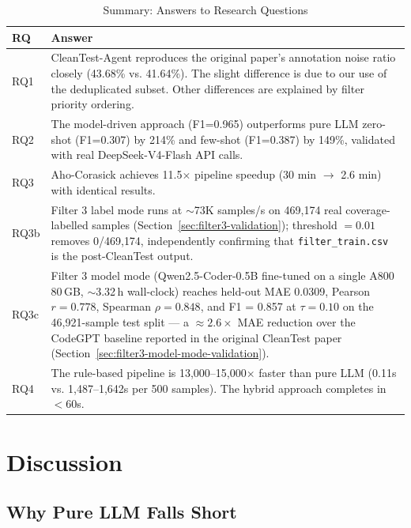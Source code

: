 \documentclass[acmlarge,nonacm,screen]{acmart}
\begin{document}
\begin{table}[htbp]
\caption{Summary: Answers to Research Questions}
\label{tab:rq-summary}
\begin{tabular}{@{}lp{9cm}@{}}
\toprule
\textbf{RQ} & \textbf{Answer} \\
\midrule
RQ1 & CleanTest-Agent reproduces the original paper's annotation noise ratio closely (43.68\% vs. 41.64\%). The slight difference is due to our use of the deduplicated subset. Other differences are explained by filter priority ordering. \\
RQ2 & The model-driven approach (F1=0.965) outperforms pure LLM zero-shot (F1=0.307) by 214\% and few-shot (F1=0.387) by 149\%, validated with real DeepSeek-V4-Flash API calls. \\
RQ3 & Aho-Corasick achieves 11.5$\times$ pipeline speedup (30 min $\to$ 2.6 min) with identical results. \\
RQ3b & Filter 3 label mode runs at $\sim$73K samples/s on 469{,}174 real coverage-labelled samples (Section~\ref{sec:filter3-validation}); threshold $=0.01$ removes 0/469{,}174, independently confirming that \texttt{filter\_train.csv} is the post-CleanTest output. \\
RQ3c & Filter 3 model mode (Qwen2.5-Coder-0.5B fine-tuned on a single A800 80\,GB, $\sim$3.32\,h wall-clock) reaches held-out MAE 0.0309, Pearson $r = 0.778$, Spearman $\rho = 0.848$, and F1 = 0.857 at $\tau = 0.10$ on the 46{,}921-sample test split --- a $\approx 2.6\times$ MAE reduction over the CodeGPT baseline reported in the original CleanTest paper (Section~\ref{sec:filter3-model-mode-validation}). \\
RQ4 & The rule-based pipeline is 13,000--15,000$\times$ faster than pure LLM (0.11s vs. 1,487--1,642s per 500 samples). The hybrid approach completes in $<$60s. \\
\bottomrule
\end{tabular}
\end{table}


\section{Discussion}
\label{sec:discussion}

\subsection{Why Pure LLM Falls Short}
\end{document}
